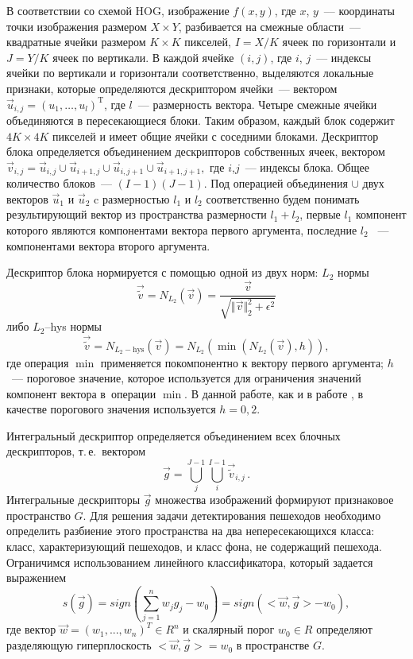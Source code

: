 \documentclass[12pt,twoside]{article}
\begin{document}
В соответствии со схемой HOG, изображение $f(x,y)$, где $x$, $y$~--– координаты точки изображения размером $X\times Y$, разбивается на смежные области~--– квадратные ячейки размером $K\times K$ пикселей, $I=X/K$ ячеек по горизонтали и $J=Y/K$ ячеек по вертикали. 
В каждой ячейке $(i,j)$, где $i$, $j$~--- индексы ячейки по вертикали 	и горизонтали соответственно, выделяются локальные признаки, которые определяются дескриптором ячейки~--- вектором $\vec{u}_{i,j} = (u_1, \dots , u_l)^{\mathrm{T}}$, где $l$~---	размерность вектора. Четыре смежные ячейки объединяются в пересекающиеся блоки. Таким образом, каждый блок содержит $4K \times 4K$ пикселей и имеет общие ячейки с соседними блоками. Дескриптор блока определяется объединением дескрипторов собственных ячеек, вектором $\vec{v}_{i,j} = \vec{u}_{i,j}\cup\vec{u}_{i+1,j}\cup\vec{u}_{i,j+1}
	\cup\vec{u}_{i+1,j+1},$ где $i$,$j$~--- индексы блока.
	Общее количество блоков~--- $(I-1)(J-1)$. Под операцией
	объединения $\cup$ двух векторов $\vec{u}_{1}$ и $\vec{u}_{2}$
	c размерностью $l_{1}$ и $l_{2}$ соответственно будем понимать результирующий вектор из пространства размерности $l_{1}+l_{2}$, первые $l_{1}$ компонент которого являются компонентами вектора первого аргумента, последние $l_{2}$ ~--- компонентами вектора второго аргумента.
	
	 Дескриптор блока нормируется с помощью одной из двух норм:
		 $L_2$ нормы
\begin{equation*}
	\vec{\tilde{v}} = N_{L_{2}}(\vec{v}) =  \frac{\vec{v}}{\sqrt{\Vert \vec{v} \Vert_{2}^{2} + \epsilon^{2}}}
	\label{eq:L2}
\end{equation*}
либо $L_2$--hys нормы \cite{dalaltriggs2005}
\begin{equation*}
	\vec{\tilde{v}} = N_{L_{2}-\mathrm{hys}}(\vec{v}) =  N_{L_{2}}
	\left(\min(N_{L_{2}}(\vec{v}),h)\right),
	\label{eq:L2-hys}
\end{equation*}
где операция $\min$ применяется покомпонентно к вектору первого
аргумента; $h$~--- пороговое значение, которое используется для
ограничения значений компонент вектора в~операции $\min$. В данной работе, как и в работе \cite{dalaltriggs2005}, в качестве порогового значения используется $h=0{,}2$.


Интегральный дескриптор определяется объединением всех
блочных дескрипторов, т.\,е.\ вектором
\begin{equation}
\vec {g}=\bigcup_j^{J-1}{\bigcup_i^{I-1}{\vec{\tilde{v}}_{i,j}}}\,.
\end{equation}
Интегральные дескрипторы $\vec{g}$ множества изображений формируют признаковое пространство $G$. Для решения задачи детектирования пешеходов необходимо определить разбиение этого пространства на два непересекающихся класса: класс, характеризующий пешеходов, и класс фона, не содержащий пешехода. Ограничимся использованием линейного классификатора, который задается выражением
\begin{equation}
		s(\vec{g}) = sign( \sum_{j=1}^{n} w_{j}g_{j} -w_{0}) = sign(<\vec{w},\vec{g}> - w_{0}), 
\end{equation}
где  вектор $\vec{w} = (w_{1}, . . . , w_{n})^{T} \in R^{n} $ и скалярный порог $w_{0} \in R$ определяют разделяющую гиперплоскость $<\vec{w},\vec{g}> = w_{0}$ в пространстве $G$.	
\end{document}
